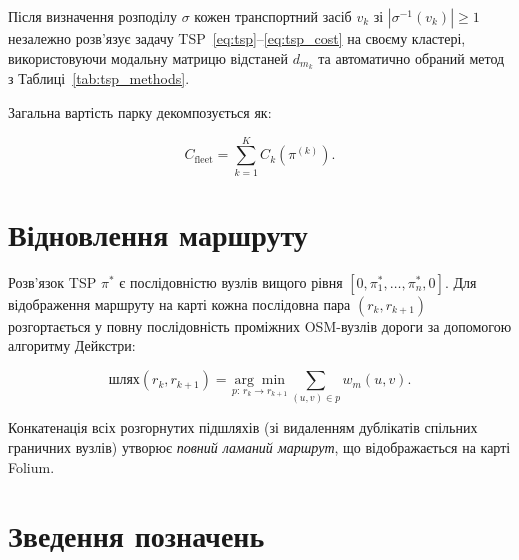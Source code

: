 \documentclass[12pt, a4paper]{article}
\theoremstyle{definition}
\begin{document}
Після визначення розподілу $\sigma$ кожен транспортний засіб $v_k$ зі
$|\sigma^{-1}(v_k)| \geq 1$ незалежно розв'язує задачу
TSP~\eqref{eq:tsp}--\eqref{eq:tsp_cost} на своєму кластері, використовуючи
модальну матрицю відстаней $d_{m_k}$ та автоматично обраний метод з
Таблиці~\ref{tab:tsp_methods}.

Загальна вартість парку декомпозується як:

\begin{equation}
  \label{eq:fleet_cost}
  C_{\text{fleet}} = \sum_{k=1}^{K} C_k(\pi^{(k)}).
\end{equation}

\section{Відновлення маршруту}

Розв'язок TSP $\pi^*$ є послідовністю вузлів вищого рівня
$[0, \pi_1^*, \ldots, \pi_n^*, 0]$. Для відображення маршруту на карті кожна
послідовна пара $(r_k, r_{k+1})$ розгортається у повну послідовність
проміжних OSM-вузлів дороги за допомогою алгоритму Дейкстри:

\begin{equation}
  \label{eq:reconstruct}
  \text{шлях}(r_k, r_{k+1}) = \underset{p:\, r_k \to r_{k+1}}{\arg\min}
    \sum_{(u,v) \in p} w_m(u, v).
\end{equation}

Конкатенація всіх розгорнутих підшляхів (зі видаленням дублікатів спільних
граничних вузлів) утворює \emph{повний ламаний маршрут}, що відображається
на карті Folium.

\section{Зведення позначень}
\end{document}
